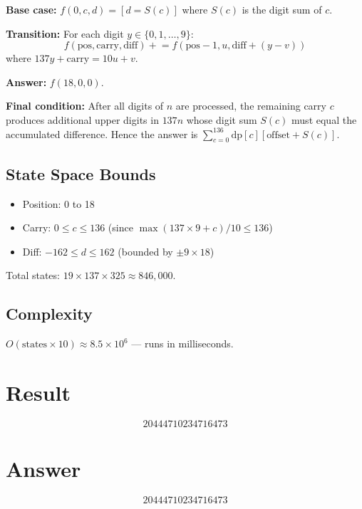 \documentclass[12pt]{article}
\begin{document}
\textbf{Base case:} $f(0, c, d) = [d = S(c)]$ where $S(c)$ is the digit sum of $c$.

\textbf{Transition:} For each digit $y \in \{0, 1, \ldots, 9\}$:
\[
f(\text{pos}, \text{carry}, \text{diff}) \mathrel{+}= f(\text{pos}-1, u, \text{diff} + (y - v))
\]
where $137y + \text{carry} = 10u + v$.

\textbf{Answer:} $f(18, 0, 0)$.

\textbf{Final condition:} After all digits of $n$ are processed, the remaining carry $c$ produces additional upper digits in $137n$ whose digit sum $S(c)$ must equal the accumulated difference. Hence the answer is $\sum_{c=0}^{136} \text{dp}[c][\text{offset} + S(c)]$.

\subsection{State Space Bounds}

\begin{itemize}
    \item Position: 0 to 18
    \item Carry: $0 \le c \le 136$ (since $\max(137 \times 9 + c) / 10 \le 136$)
    \item Diff: $-162 \le d \le 162$ (bounded by $\pm 9 \times 18$)
\end{itemize}

Total states: $19 \times 137 \times 325 \approx 846{,}000$.

\subsection{Complexity}

$O(\text{states} \times 10) \approx 8.5 \times 10^6$ --- runs in milliseconds.

\section{Result}

\[
\boxed{20444710234716473}
\]

\section{Answer}

\[
\boxed{20444710234716473}
\]
\end{document}
